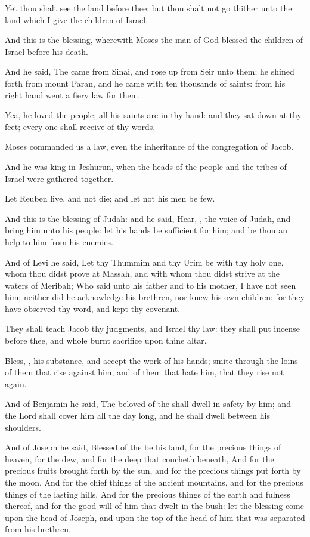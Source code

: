\Verse Yet thou shalt see the land before thee; but thou shalt not go thither unto the land which I give the children of Israel.


\Chapter
\Verse And this is the blessing, wherewith Moses the man of God blessed the children of Israel before his death.

\Verse And he said, The \LORD came from Sinai, and rose up from Seir unto them; he shined forth from mount Paran, and he came with ten thousands of saints: from his right hand went a fiery law for them.

\Verse Yea, he loved the people; all his saints are in thy hand: and they sat down at thy feet; every one shall receive of thy words.

\Verse Moses commanded us a law, even the inheritance of the congregation of Jacob.

\Verse And he was king in Jeshurun, when the heads of the people and the tribes of Israel were gathered together.

\Verse Let Reuben live, and not die; and let not his men be few.

\Verse And this is the blessing of Judah: and he said, Hear, \LORD, the voice of Judah, and bring him unto his people: let his hands be sufficient for him; and be thou an help to him from his enemies.

\Verse And of Levi he said, Let thy Thummim and thy Urim be with thy holy one, whom thou didst prove at Massah, and with whom thou didst strive at the waters of Meribah; \Verse Who said unto his father and to his mother, I have not seen him; neither did he acknowledge his brethren, nor knew his own children: for they have observed thy word, and kept thy covenant.

\Verse They shall teach Jacob thy judgments, and Israel thy law: they shall put incense before thee, and whole burnt sacrifice upon thine altar.

\Verse Bless, \LORD, his substance, and accept the work of his hands; smite through the loins of them that rise against him, and of them that hate him, that they rise not again.

\Verse And of Benjamin he said, The beloved of the \LORD shall dwell in safety by him; and the Lord shall cover him all the day long, and he shall dwell between his shoulders.

\Verse And of Joseph he said, Blessed of the \LORD be his land, for the precious things of heaven, for the dew, and for the deep that coucheth beneath, \Verse And for the precious fruits brought forth by the sun, and for the precious things put forth by the moon, \Verse And for the chief things of the ancient mountains, and for the precious things of the lasting hills, \Verse And for the precious things of the earth and fulness thereof, and for the good will of him that dwelt in the bush: let the blessing come upon the head of Joseph, and upon the top of the head of him that was separated from his brethren.

